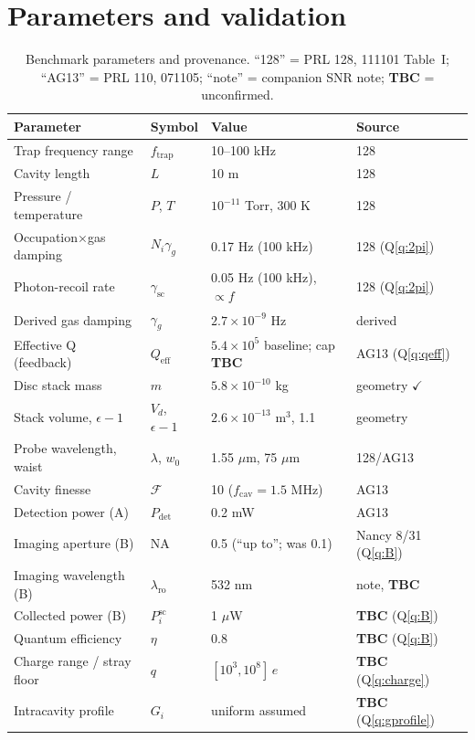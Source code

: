 \documentclass[11pt]{article}
\begin{document}
\section{Parameters and validation}
\label{sec:anchor}

\begin{table}[h]
\centering
\caption{Benchmark parameters and provenance. ``128'' = PRL 128,
111101 Table~I; ``AG13'' = PRL 110, 071105; ``note'' = companion SNR
note; \textbf{TBC} = unconfirmed.}
\label{tab:params}
\begin{tabular}{@{}llll@{}}
\toprule
Parameter & Symbol & Value & Source \\
\midrule
Trap frequency range & $f_{\mathrm{trap}}$ & 10--100 kHz & 128 \\
Cavity length & $L$ & 10 m & 128 \\
Pressure / temperature & $P$, $T$ & $10^{-11}$ Torr, 300 K & 128 \\
Occupation$\times$gas damping & $N_i\gamma_g$ & 0.17 Hz (100 kHz) & 128 (Q\ref{q:2pi}) \\
Photon-recoil rate & $\gamma_{\mathrm{sc}}$ & 0.05 Hz (100 kHz), $\propto f$ & 128 (Q\ref{q:2pi}) \\
Derived gas damping & $\gamma_g$ & $2.7\times10^{-9}$ Hz & derived \\
Effective Q (feedback) & $Q_{\mathrm{eff}}$ & $5.4\times10^5$ baseline; cap \textbf{TBC} & AG13 (Q\ref{q:qeff}) \\
Disc stack mass & $m$ & $5.8\times10^{-10}$ kg & geometry $\checkmark$ \\
Stack volume, $\epsilon-1$ & $V_d$, $\epsilon-1$ & $2.6\times10^{-13}$ m$^3$, 1.1 & geometry \\
Probe wavelength, waist & $\lambda$, $w_0$ & 1.55 $\mu$m, 75 $\mu$m & 128/AG13 \\
Cavity finesse & $\mathcal{F}$ & 10 ($f_{\mathrm{cav}} = 1.5$ MHz) & AG13 \\
Detection power (A) & $P_{\det}$ & 0.2 mW & AG13 \\
Imaging aperture (B) & NA & 0.5 (``up to''; was 0.1) & Nancy 8/31 (Q\ref{q:B}) \\
Imaging wavelength (B) & $\lambda_{\mathrm{ro}}$ & 532 nm & note, \textbf{TBC} \\
Collected power (B) & $P^{\mathrm{sc}}_i$ & 1 $\mu$W & \textbf{TBC} (Q\ref{q:B}) \\
Quantum efficiency & $\eta$ & 0.8 & \textbf{TBC} (Q\ref{q:B}) \\
Charge range / stray floor & $q$ & $[10^3, 10^8]\,e$ & \textbf{TBC} (Q\ref{q:charge}) \\
Intracavity profile & $G_i$ & uniform assumed & \textbf{TBC} (Q\ref{q:gprofile}) \\
\bottomrule
\end{tabular}
\end{table}
\end{document}
